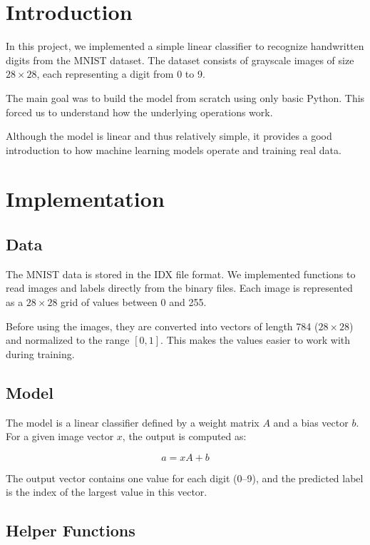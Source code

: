 \documentclass[a4paper, 11pt]{report}
\begin{document}
\newpage

\section*{Introduction}

In this project, we implemented a simple linear classifier to recognize handwritten digits from the MNIST dataset. The dataset consists of grayscale images of size $28 \times 28$, each representing a digit from 0 to 9.

The main goal was to build the model from scratch using only basic Python. This forced us to understand how the underlying operations work.

Although the model is linear and thus relatively simple, it provides a good introduction to how machine learning models operate and training real data.

\vspace{20pt}
\section*{Implementation}

\subsection*{Data}

The MNIST data is stored in the IDX file format. We implemented functions to read images and labels directly from the binary files. Each image is represented as a $28 \times 28$ grid of values between 0 and 255.

Before using the images, they are converted into vectors of length 784 ($28 \times 28$) and normalized to the range $[0, 1]$. This makes the values easier to work with during training.

\subsection*{Model}

The model is a linear classifier defined by a weight matrix $A$ and a bias vector $b$. For a given image vector $x$, the output is computed as:

\[
a = xA + b
\]

The output vector contains one value for each digit (0--9), and the predicted label is the index of the largest value in this vector.

\subsection*{Helper Functions}
\end{document}
